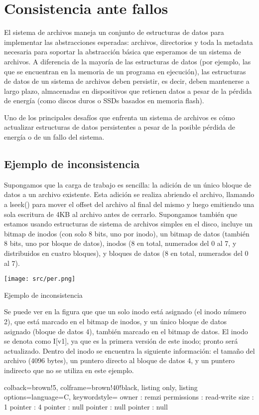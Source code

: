 \documentclass[openany]{book}
\begin{document}
\section{Consistencia ante fallos}

El sistema de archivos maneja un conjunto de estructuras de datos para implementar las abstracciones esperadas: archivos, directorios y toda la metadata necesaria para soportar la abstracción básica que esperamos de un sistema de archivos. A diferencia de la mayoría de las estructuras de datos (por ejemplo, las que se encuentran en la memoria de un programa en ejecución), las estructuras de datos de un sistema de archivos deben persistir, es decir, deben mantenerse a largo plazo, almacenadas en dispositivos que retienen datos a pesar de la pérdida de energía (como discos duros o SSDs basados en memoria flash).

Uno de los principales desafíos que enfrenta un sistema de archivos es cómo \colorbox{blue!20}{actualizar estructuras de datos}  \colorbox{blue!20}{persistentes} a pesar de la posible pérdida de energía o de un fallo del sistema.

\subsection{Ejemplo de inconsistencia}

Supongamos que la carga de trabajo es sencilla: la adición de un único bloque de datos a un archivo existente. Esta adición se realiza \colorbox{blue!20}{abriendo} el archivo, llamando a \colorbox{blue!20}{lseek()} para mover el offset del archivo al final del mismo y luego emitiendo una sola escritura de 4KB al archivo antes de cerrarlo. Supongamos también que estamos usando estructuras de sistema de archivos simples en el disco, incluye un bitmap de inodos (con solo 8 bits, uno por inodo), un bitmap de datos (también 8 bits, uno por bloque de datos), inodos (8 en total, numerados del 0 al 7, y distribuidos en cuatro bloques), y bloques de datos (8 en total, numerados del 0 al 7).

\begin{floatingfigure}[r]{0.6\textwidth}
    \texttt{[image: src/per.png]}
    \caption{Ejemplo de inconsistencia}
\end{floatingfigure}

Se puede ver en la figura que que un solo inodo está asignado (el inodo número 2), que está marcado en el bitmap de inodos, y un único bloque de datos asignado (bloque de datos 4), también marcado en el bitmap de datos. El inodo se denota como I[v1], ya que es la primera versión de este inodo; pronto será actualizado. Dentro del inodo se encuentra la siguiente información: el tamaño del archivo (4096 bytes), un puntero directo al bloque de datos 4, y un puntero indirecto que no se utiliza en este ejemplo.
\begin{tcblisting}{colback=brown!5, colframe=brown!40!black, listing only, listing options={language=C, keywordstyle=\color{blue!35!white}\bfseries}}
owner : remzi
permissions : read-write
size : 1
pointer : 4
pointer : null
pointer : null
pointer : null
\end{tcblisting}
\end{document}
